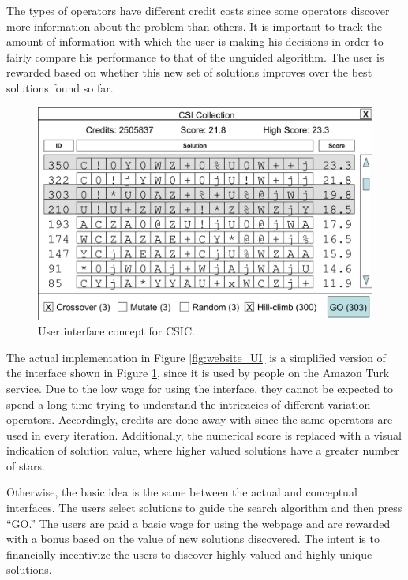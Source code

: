The types of operators have different credit costs since some operators discover more information about the problem than others. It is important to track the amount of information with which the user is making his decisions in order to fairly compare his performance to that of the unguided algorithm.  The user is rewarded based on whether this new set of solutions improves over the best solutions found so far.  

\begin{figure}[!t]
  \centering
  \includegraphics[width=4.5in]{HollowayCSICUI2}
  \caption{User interface concept for CSIC.}
  \label{fig:CSIC_UI}
\end{figure}

The actual implementation in Figure \ref{fig:website_UI} is a simplified version of the interface shown in Figure \ref{fig:CSIC_UI}, since it is used by people on the Amazon Turk service.  Due to the low wage for using the interface, they cannot be expected to spend a long time trying to understand the intricacies of different variation operators.  Accordingly, credits are done away with since the same operators are used in every iteration.  Additionally, the numerical score is replaced with a visual indication of solution value, where higher valued solutions have a greater number of stars.

Otherwise, the basic idea is the same between the actual and conceptual interfaces.  The users select solutions to guide the search algorithm and then press ``GO.''  The users are paid a basic wage for using the webpage and are rewarded with a bonus based on the value of new solutions discovered.  The intent is to financially incentivize the users to discover highly valued and highly unique solutions. 

